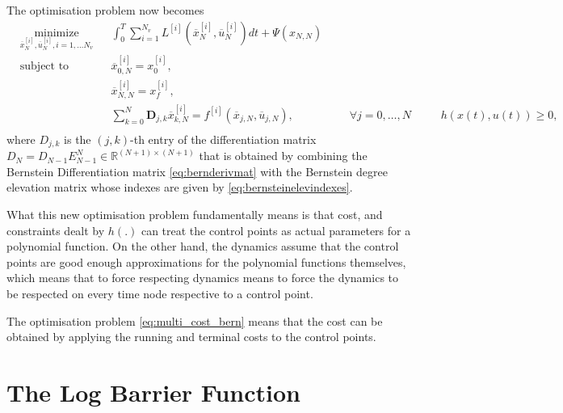 \par The optimisation problem now becomes 
\begin{equation}
    \label{eq:multi_cost_bern}
    \begin{aligned}
    & \underset{\overline{x}_N^{[i]},\overline{u}_N^{[i]},i= 1,\dots N_v}{\text{minimize}} && \int_0^T \sum_{i=1}^{N_v}  L^{[i]} (\overline{x}_N^{[i]},\overline{u}_N^{[i]})dt + \Psi (x_{N,N}) \\
    & \text{subject to}  && \overline{x}^{[i]}_{0,N} = x_0^{[i]}, \\
        & && \overline{x}^{[i]}_{N,N} = x_f^{[i]}, \\
        & && \sum_{k=0}^{N} \boldsymbol{D}_{j,k} \overline{x}_{k,N}^{[i]} = f^{[i]} (\overline{x}_{j,N},\overline{u}_{j,N}), &&& \forall j=0,\dots,N\
        & && h(x(t),u(t)) \geq 0, \\
    \end{aligned}
\end{equation}
where $D_{j,k}$ is the $(j,k)$-th entry of the differentiation matrix $D_N = D_{N-1}E^N_{N-1}\in \mathbb{R}^{(N+1)\times(N+1)}$ that is obtained by combining the Bernstein Differentiation matrix \eqref{eq:bernderivmat} with the Bernstein degree elevation matrix whose indexes are given by \eqref{eq:bernsteinelevindexes}.
\par What this new optimisation problem fundamentally means is that cost, and constraints dealt by $h(.)$ can treat the control points as actual parameters for a polynomial function. On the other hand, the dynamics assume that the control points are good enough approximations for the polynomial functions themselves, which means that to force respecting dynamics means to force the dynamics to be respected on every time node respective to a control point.
\par The optimisation problem \eqref{eq:multi_cost_bern} means that the cost can be obtained by applying the running and terminal costs to the control points.


\section{The Log Barrier Function}
\label{sec:logbarrierfunc}

